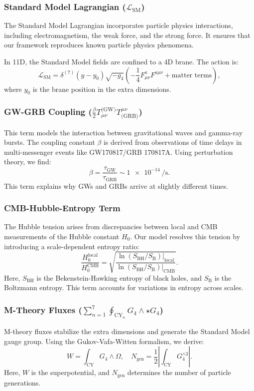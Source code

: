 \documentclass[12pt, a4paper]{article}
\begin{document}
\subsubsection{Standard Model Lagrangian ($\mathcal{L}_{\text{SM}}$)}
The Standard Model Lagrangian incorporates particle physics interactions, including electromagnetism, the weak force, and the strong force. It ensures that our framework reproduces known particle physics phenomena.

In 11D, the Standard Model fields are confined to a 4D brane. The action is:
\[
\mathcal{L}_{\text{SM}} = \delta^{(7)}(y - y_0) \sqrt{-g_4} \left( -\frac{1}{4} F_{\mu\nu}^a F^{a\mu\nu} + \text{matter terms} \right),
\]
where \(y_0\) is the brane position in the extra dimensions.

\subsubsection{GW-GRB Coupling ($\frac{\beta}{2} T_{\mu\nu}^{\text{(GW)}} T^{\mu\nu}_{\text{(GRB)}}$)}
This term models the interaction between gravitational waves and gamma-ray bursts. The coupling constant \(\beta\) is derived from observations of time delays in multi-messenger events like GW170817/GRB 170817A. Using perturbation theory, we find:
\[
\beta = \frac{\tau_{\text{GW}}}{\tau_{\text{GRB}}} \sim \SI{1e-14}{\per\second}.
\]
This term explains why GWs and GRBs arrive at slightly different times.

\subsubsection{CMB-Hubble-Entropy Term}
The Hubble tension arises from discrepancies between local and CMB measurements of the Hubble constant \(H_0\). Our model resolves this tension by introducing a scale-dependent entropy ratio:
\[
\frac{H_0^{\text{local}}}{H_0^{\text{CMB}}} = \sqrt{\frac{\ln(S_{\text{BH}}/S_{\text{B}})|_{\text{local}}}{\ln(S_{\text{BH}}/S_{\text{B}})|_{\text{CMB}}}}.
\]
Here, \(S_{\text{BH}}\) is the Bekenstein-Hawking entropy of black holes, and \(S_{\text{B}}\) is the Boltzmann entropy. This term accounts for variations in entropy across scales.

\subsubsection{M-Theory Fluxes ($\sum_{n=1}^7 \oint_{\text{CY}_n} G_4 \wedge \star G_4$)}
M-theory fluxes stabilize the extra dimensions and generate the Standard Model gauge group. Using the Gukov-Vafa-Witten formalism, we derive:
\[
W = \int_{\text{CY}} G_4 \wedge \Omega,\quad N_{\text{gen}} = \frac{1}{2} \left| \int_{\text{CY}} G_4^{\wedge 3} \right|.
\]
Here, \(W\) is the superpotential, and \(N_{\text{gen}}\) determines the number of particle generations.
\end{document}
